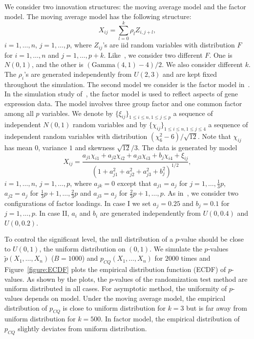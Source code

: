 \documentclass[review]{elsarticle}
\theoremstyle{plain}
\theoremstyle{definition}
\theoremstyle{remark}
\begin{document}
We consider two innovation structures: the moving average model and the factor model.
The moving average model has the following structure:
    \begin{equation*}
    X_{ij}=\sum_{l=0}^k \rho_{l}Z_{i,j+l},
    \end{equation*}
$i=1,\ldots, n$, $j=1,\ldots, p$, where $Z_{ij}$'s are iid random variables with distribution $F$ for $i=1,\ldots, n$ and $j=1,\ldots, p+k$. 
Like~\citet{Chen2010A}, we consider two different $F$.
One is $N(0,1)$, and the other is $(\textrm{Gamma}(4,1)-4)/2$.
We also consider different $k$.
The $\rho_i$'s are generated independently from $U(2,3)$ and are kept fixed throughout the simulation.
The second model we consider is the factor model in~\citet{fan2007to}.
In the simulation study of~\citet{fan2007to}, the factor model is used to reflect aspects of gene expression data.
The model involves three group factor and one common factor among all $p$ variables. 
We denote by $\{\xi_{ij}\}_{1\leq i\leq n, 1\leq j\leq p}$ a sequence of independent $N(0,1)$ random variables and by $\{\chi_{ij}\}_{1\leq i \leq n, 1\leq j \leq 4}$ a sequence of independent random variables with distribution $(\chi_{6}^2-6)/\sqrt{12}$.
Note that $\chi_{ij}$ has mean $0$, variance $1$ and skewness $\sqrt{12}/3$.
The data is generated by model
\begin{equation*}
    X_{ij}=\frac{a_{j1}\chi_{i1}+a_{j2}\chi_{i2}+a_{j3}\chi_{i3}+b_{j}\chi_{i4}+\xi_{ij}}{{(1+a_{j1}^2+a_{j2}^2+a_{j3}^2+b_j^2)}^{1/2}},
\end{equation*}
$i=1,\ldots, n$, $j=1,\ldots, p$,
where $a_{jk}=0$ except that $a_{j1}=a_j$ for $j=1,\ldots,\frac{1}{3}p$, $a_{j2}=a_j$ for $\frac{1}{3}p+1,\ldots,\frac{2}{3}p$ and $a_{j3}=a_j$ for $\frac{2}{3}p+1,\ldots,p$.
As in~\citet{fan2007to}, we consider two configurations of factor loadings. In  case I we set $a_j=0.25$ and $b_j=0.1$ for $j=1,\ldots, p$. In case II, $a_i$ and $b_i$ are generated independently from $U(0,0.4)$ and $U(0,0.2)$.

To control the significant level, the null distribution of a $p$-value should be close to $U(0,1)$, the uniform distribution on $(0,1)$.
We simulate the $p$-values $\tilde{p}(X_1,\ldots,X_n)$ ($B=1000$) and $p_{CQ}(X_1,\ldots,X_n)$ for $2000$ times and Figure~\ref{figure:ECDF} plots the empirical distribution function (ECDF) of $p$-values.
As shown by the plots, the $p$-values of the randomization test method are uniform distributed in all cases.
For asymptotic method, the uniformity of $p$-values depends on model.
Under the moving average model, the empirical distribution of $p_{CQ}$ is close to uniform distribution for $k=3$ but is far away from uniform distribution for $k=500$.
In factor model, the empirical distribution of $p_{CQ}$ slightly deviates from uniform distribution.
\end{document}
